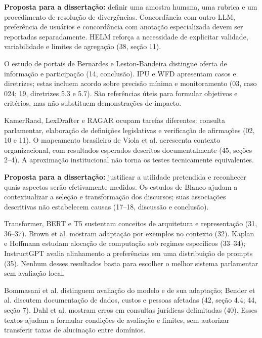 \textbf{Proposta para a dissertação:} definir uma amostra humana, uma rubrica e um procedimento de resolução de divergências. Concordância com outro LLM, preferência de usuários e concordância com anotação especializada devem ser reportadas separadamente. HELM reforça a necessidade de explicitar validade, variabilidade e limites de agregação (38, seção 11).

\clearpage
{}
O estudo de portais de Bernardes e Leston-Bandeira distingue oferta de informação e participação (14, conclusão). IPU e WFD apresentam casos e diretrizes; estas incluem acordo sobre precisão mínima e monitoramento (03, caso 024; 19, diretrizes 5.3 e 5.7). São referências úteis para formular objetivos e critérios, mas não substituem demonstrações de impacto.

KamerRaad, LexDrafter e RAGAR ocupam tarefas diferentes: consulta parlamentar, elaboração de definições legislativas e verificação de afirmações (02, 10 e 11). O mapeamento brasileiro de Viola et al. acrescenta contexto organizacional, com resultados esperados descritos documentalmente (45, seções 2–4). A aproximação institucional não torna os testes tecnicamente equivalentes.

\textbf{Proposta para a dissertação:} justificar a utilidade pretendida e reconhecer quais aspectos serão efetivamente medidos. Os estudos de Blanco ajudam a contextualizar a seleção e transformação dos discursos; suas associações descritivas não estabelecem causas (17–18, discussão e conclusão).

Transformer, BERT e T5 sustentam conceitos de arquitetura e representação (31, 36–37). Brown et al. mostram adaptação por exemplos no contexto (32). Kaplan e Hoffmann estudam alocação de computação sob regimes específicos (33–34); InstructGPT avalia alinhamento a preferências em uma distribuição de prompts (35). Nenhum desses resultados basta para escolher o melhor sistema parlamentar sem avaliação local.

Bommasani et al. distinguem avaliação do modelo e de sua adaptação; Bender et al. discutem documentação de dados, custos e pessoas afetadas (42, seção 4.4; 44, seção 7). Dahl et al. mostram erros em consultas jurídicas delimitadas (40). Esses textos ajudam a formular condições de avaliação e limites, sem autorizar transferir taxas de alucinação entre domínios.

